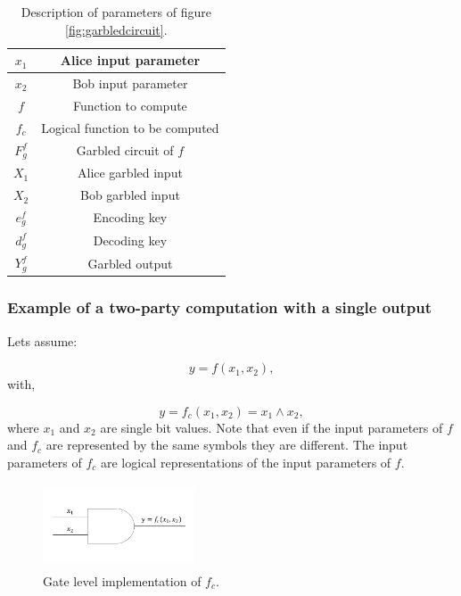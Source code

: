 \begin{refsection}
\begin{table}[H]
\begin{tabular}{|c|c|}
\hline
$x_1$                   & Alice input parameter             \\ \hline
$x_2$                   & Bob input parameter               \\ \hline
$f$                     & Function to compute               \\ \hline
$f_c$                   & Logical function to be computed   \\ \hline
$F_g^f$                 & Garbled circuit of $f$            \\ \hline
$X_1$                   & Alice garbled input               \\ \hline
$X_2$                   & Bob garbled input                 \\ \hline
$e_g^f$                 & Encoding key                      \\ \hline
$d_g^f$                 & Decoding key                      \\ \hline
$Y_g^f$                 & Garbled output                    \\ \hline
\end{tabular}
\caption{Description of parameters of figure \ref{fig:garbledcircuit}.}
\end{table}




\subsubsection{Example of a two-party computation with a single output}

Lets assume:

\begin{equation}\label{eq:f_to_be_computed}
  y=f(x_1,x_2),
\end{equation}
with,

\begin{equation}\label{eq:fc_to_be_computed}
  y=f_c(x_1, x_2) = x_1 \wedge x_2,
\end{equation}
where $x_1$ and $x_2$ are single bit values. Note that even if the input parameters of $f$ and $f_c$ are represented by the same symbols they are different. The input parameters of $f_c$ are logical representations of the input parameters of $f$.

\begin{figure}[H]
	\centering
	\includegraphics[width=0.4\textwidth, height=2.5cm]{./sdf/secure_multiparty_computation/figures/Gate.png}
    \caption{Gate level implementation of $f_c$.}\label{fig:andGate}
\end{figure}


\end{refsection}
